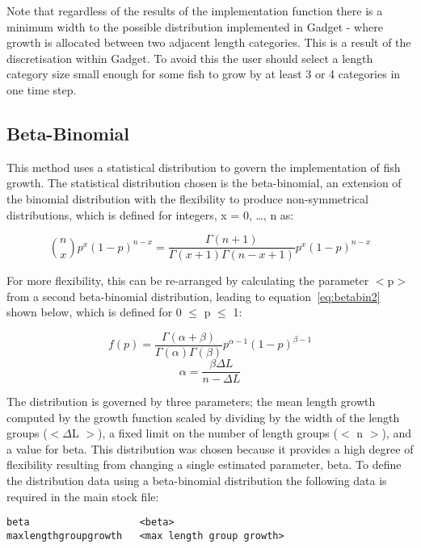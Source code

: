 \documentclass[10pt,twoside]{book}
\begin{document}
\bigskip
Note that regardless of the results of the implementation function there is a minimum width to the possible distribution implemented in Gadget - where growth is allocated between two adjacent length categories.  This is a result of the discretisation within Gadget.  To avoid this the user should select a length category size small enough for some fish to grow by at least 3 or 4 categories in one time step.

\subsection{Beta-Binomial}
This method uses a statistical distribution to govern the implementation of fish growth.  The statistical distribution chosen is the beta-binomial, an extension of the binomial distribution with the flexibility to produce non-symmetrical distributions, which is defined for integers, x = 0, \ldots, n as:

\begin{equation}\label{eq:betabin1}
{n \choose x} p^x (1 - p)^{n - x} = \frac{\Gamma(n + 1)}{\Gamma(x + 1)\Gamma(n - x + 1)} p^x (1 - p)^{n - x}
\end{equation}

For more flexibility, this can be re-arranged by calculating the parameter $<$p$>$ from a second beta-binomial distribution, leading to equation~\ref{eq:betabin2} shown below, which is defined for 0 $\le$ p $\le$ 1:

\begin{equation}\label{eq:betabin2}
f(p) = \frac{\Gamma(\alpha + \beta)}{\Gamma(\alpha) \Gamma(\beta)}p^{\alpha - 1}(1 - p)^{\beta - 1}
\end{equation}
\begin{equation}\label{eq:betabin3}
\alpha = \frac{\beta \Delta L}{n - \Delta L}
\end{equation}

The distribution is governed by three parameters; the mean length growth computed by the growth function scaled by dividing by the width of the length groups ($<\Delta$L $>$), a fixed limit on the number of length groups ($<$ n $>$), and a value for beta.  This distribution was chosen because it provides a high degree of flexibility resulting from changing a single estimated parameter, beta.  To define the distribution data using a beta-binomial distribution the following data is required in the main stock file:

{\small\begin{verbatim}
beta                   <beta>
maxlengthgroupgrowth   <max length group growth>
\end{verbatim}}
\end{document}
